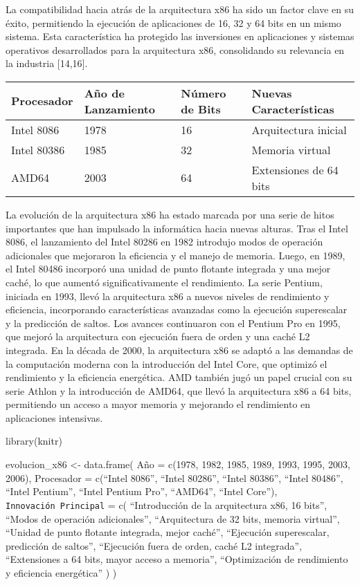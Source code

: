\documentclass[12pt,twoside]{templates/unerthesis}
\begin{document}
La compatibilidad hacia atrás de la arquitectura x86 ha sido un factor clave en su éxito, permitiendo la ejecución de aplicaciones de 16, 32 y 64 bits en un mismo sistema. Esta característica ha protegido las inversiones en aplicaciones y sistemas operativos desarrollados para la arquitectura x86, consolidando su relevancia en la industria {[}14,16{]}.

\begin{longtable}[]{@{}llll@{}}
\toprule
Procesador & Año de Lanzamiento & Número de Bits & Nuevas Características\tabularnewline
\midrule
\endhead
Intel 8086 & 1978 & 16 & Arquitectura inicial\tabularnewline
Intel 80386 & 1985 & 32 & Memoria virtual\tabularnewline
AMD64 & 2003 & 64 & Extensiones de 64 bits\tabularnewline
\bottomrule
\end{longtable}

La evolución de la arquitectura x86 ha estado marcada por una serie de hitos importantes que han impulsado la informática hacia nuevas alturas. Tras el Intel 8086, el lanzamiento del Intel 80286 en 1982 introdujo modos de operación adicionales que mejoraron la eficiencia y el manejo de memoria. Luego, en 1989, el Intel 80486 incorporó una unidad de punto flotante integrada y una mejor caché, lo que aumentó significativamente el rendimiento.
La serie Pentium, iniciada en 1993, llevó la arquitectura x86 a nuevos niveles de rendimiento y eficiencia, incorporando características avanzadas como la ejecución superescalar y la predicción de saltos. Los avances continuaron con el Pentium Pro en 1995, que mejoró la arquitectura con ejecución fuera de orden y una caché L2 integrada.
En la década de 2000, la arquitectura x86 se adaptó a las demandas de la computación moderna con la introducción del Intel Core, que optimizó el rendimiento y la eficiencia energética. AMD también jugó un papel crucial con su serie Athlon y la introducción de AMD64, que llevó la arquitectura x86 a 64 bits, permitiendo un acceso a mayor memoria y mejorando el rendimiento en aplicaciones intensivas.

library(knitr)

evolucion\_x86 \textless{}- data.frame(
Año = c(1978, 1982, 1985, 1989, 1993, 1995, 2003, 2006),
Procesador = c(``Intel 8086'', ``Intel 80286'', ``Intel 80386'', ``Intel 80486'', ``Intel Pentium'', ``Intel Pentium Pro'', ``AMD64'', ``Intel Core''),
\texttt{Innovación\ Principal} = c(
``Introducción de la arquitectura x86, 16 bits'',
``Modos de operación adicionales'',
``Arquitectura de 32 bits, memoria virtual'',
``Unidad de punto flotante integrada, mejor caché'',
``Ejecución superescalar, predicción de saltos'',
``Ejecución fuera de orden, caché L2 integrada'',
``Extensiones a 64 bits, mayor acceso a memoria'',
``Optimización de rendimiento y eficiencia energética''
)
)
\end{document}
